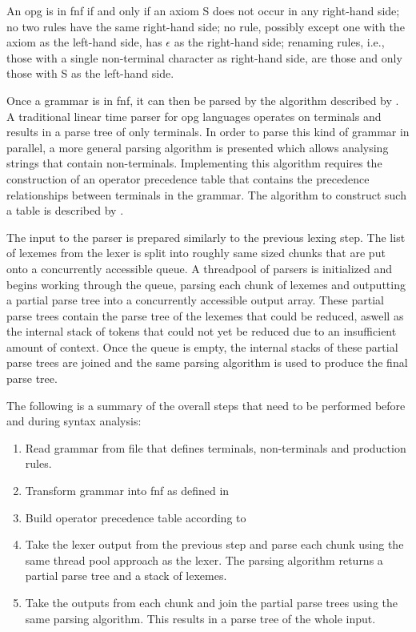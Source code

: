 An \gls{opg} is in \gls{fnf} if and only if an axiom S does not
occur in any right-hand side; no two rules have the same right-hand side;
no rule, possibly except one with the axiom as the left-hand side, has $\epsilon$ as
the right-hand side; renaming rules, i.e., those with a single non-terminal
character as right-hand side, are those and only those with S as the left-hand
side.

Once a grammar is in \gls{fnf}, it can then be parsed by the algorithm
described by \cite{barenghi_parallel_2015}. A traditional linear time parser
for \gls{opg} languages operates on terminals and results in a parse tree of
only terminals. In order to parse this kind of grammar in parallel, a more
general parsing algorithm is presented which allows analysing strings that
contain non-terminals. Implementing this algorithm requires the construction of
an operator precedence table that contains the precedence relationships between
terminals in the grammar. The algorithm to construct such a table is described
by \cite{grune_parsing_2008}.

The input to the parser is prepared similarly to the previous lexing step.
The list of lexemes from the lexer is split into roughly same sized chunks
that are put onto a concurrently accessible queue. A threadpool of parsers is
initialized and begins working through the queue, parsing each chunk of lexemes
and outputting a partial parse tree into a concurrently accessible output array.
These partial parse trees contain the parse tree of the lexemes that could be
reduced, aswell as the internal stack of tokens that could not yet be reduced
due to an insufficient amount of context. Once the queue is empty, the internal
stacks of these partial parse trees are joined and the same parsing algorithm is
used to produce the final parse tree.

The following is a summary of the overall steps that need to be performed before
and during syntax analysis:

\begin{enumerate}
	\item Read grammar from file that defines terminals, non-terminals and
  		  production rules.
	\item Transform grammar into \gls{fnf} as defined in
		  \cite{barenghi_parallel_2015}
	\item Build operator precedence table according to \cite{grune_parsing_2008}
	\item Take the lexer output from the previous step and parse each chunk using
		  the same thread pool approach as the lexer. The parsing algorithm returns a
		  partial parse tree and a stack of lexemes.
	\item Take the outputs from each chunk and join the partial parse trees using
		  the same parsing algorithm. This results in a parse tree of the whole input.
\end{enumerate}

